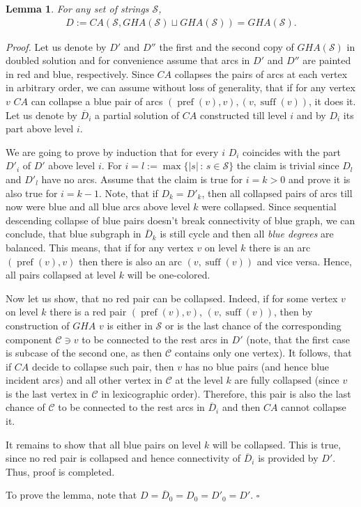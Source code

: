 \documentclass[11pt]{article}
\newtheorem{lem}{Lemma}
\DeclareMathOperator{\suff}{suff}
\DeclareMathOperator{\pref}{pref}
\begin{document}
	\begin{lem}
		For any set of strings $\mathcal{S}$,
		\begin{gather*}
			D := CA(\mathcal{S}, GHA(\mathcal{S}) \sqcup GHA(\mathcal{S})) = GHA(\mathcal{S}).
		\end{gather*}
	\end{lem}
	{\em Proof.} Let us denote by $D'$ and $D''$ the first and the second copy of $GHA(\mathcal{S})$ in doubled solution and for convenience assume that arcs in $D'$ and $D''$ are painted in red and blue, respectively. Since $CA$ collapses the pairs of arcs at each vertex in arbitrary order, we can assume without loss of generality, that if for any vertex $v$ $CA$ can collapse a blue pair of arcs $(\pref(v), v), (v, \suff(v))$, it does it. Let us denote by $\overline{D}_i$ a partial solution of $CA$ constructed till level $i$ and by $D_i$ its part above level $i$. 	
	
	We are going to prove by induction that for every $i$ $D_i$ coincides with the part $D'_i$ of $D'$ above level $i$. For $i = l := \max\{|s| \, : \, s\in\mathcal{S}\}$ the claim is trivial since $D_l$ and $D'_l$ have no arcs. Assume that the claim is true for $i = k > 0$ and prove it is also true for $i = k - 1$. Note, that if $D_k = D'_k$, then all collapsed pairs of arcs till now were blue and all blue arcs above level $k$ were collapsed. Since sequential descending collapse of blue pairs doesn't break connectivity of blue graph, we can conclude, that blue subgraph in $\overline{D}_k$ is still cycle and then all {\em blue degrees} are balanced. This means, that if for any vertex $v$ on level $k$ there is an arc $(\pref(v), v)$ then there is also an arc $(v, \suff(v))$ and vice versa. Hence, all pairs collapsed at level $k$ will be one-colored.
	
	Now let us show, that no red pair can be collapsed. Indeed, if for some vertex $v$ on level $k$ there is a red pair $(\pref(v), v)$, $(v, \suff(v))$, then by construction of $GHA$ $v$ is either in $\mathcal{S}$ or is the last chance of the corresponding component $\mathcal{C} \ni v$ to be connected to the rest arcs in $D'$ (note, that the first case is subcase of the second one, as then $\mathcal{C}$ contains only one vertex). It follows, that if $CA$ decide to collapse such pair, then $v$ has no blue pairs (and hence blue incident arcs) and all other vertex in $\mathcal{C}$ at the level $k$ are fully collapsed (since $v$ is the last vertex in $\mathcal{C}$ in lexicographic order). Therefore, this pair is also the last chance of $\mathcal{C}$ to be connected to the rest arcs in $\overline{D}_i$ and then $CA$ cannot collapse it.
	
	It remains to show that all blue pairs on level $k$ will be collapsed. This is true, since no red pair is collapsed and hence connectivity of $\overline{D}_i$ is provided by $D'$. Thus, proof is completed.
	
	To prove the lemma, note that $D = \overline{D}_0 = D_0 = D'_0 = D'$. $\square$
	
\end{document}
